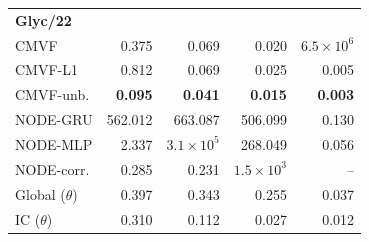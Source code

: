 \begin{tabular*}{\linewidth}{@{\extracolsep{\fill}}lrrrr}
\midrule
\multicolumn{5}{l}{\textbf{Glyc/22}} \\
CMVF & 0.375 & 0.069 & 0.020 & $6.5\!\times\!10^{6}$ \\
CMVF-L1 & 0.812 & 0.069 & 0.025 & 0.005 \\
CMVF-unb. & \textbf{0.095} & \textbf{0.041} & \textbf{0.015} & \textbf{0.003} \\
NODE-GRU & 562.012 & 663.087 & 506.099 & 0.130 \\
NODE-MLP & 2.337 & $3.1\!\times\!10^{5}$ & 268.049 & 0.056 \\
NODE-corr. & 0.285 & 0.231 & $1.5\!\times\!10^{3}$ & -- \\
Global ($\theta$) & 0.397 & 0.343 & 0.255 & 0.037 \\
IC ($\theta$) & 0.310 & 0.112 & 0.027 & 0.012 \\
\bottomrule
\end{tabular*}
